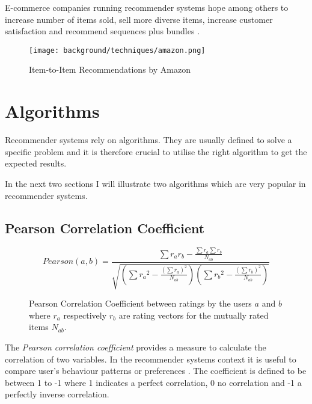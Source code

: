 E-commerce companies running recommender systems hope among others to increase number of items sold, sell more diverse items, increase customer satisfaction and recommend sequences plus bundles \cite{herlocker04}.

\begin{figure}[ht]
    \texttt{[image: background/techniques/amazon.png]}
    \caption{Item-to-Item Recommendations by Amazon}
    \label{fig:itembased-amazon}
\end{figure}



\section{Algorithms}

Recommender systems rely on algorithms. They are usually defined to solve a specific problem and it is therefore crucial to utilise the right algorithm to get the expected results.

In the next two sections I will illustrate two algorithms which are very popular in recommender systems.

\subsection{Pearson Correlation Coefficient}

\begin{figure}[ht]
    \[Pearson(a,b) = \frac{\sum r_ar_b - \frac{\sum r_a \sum r_b}{N_{ab}}}{\sqrt{(\sum {r_a}^{2} - \frac{(\sum r_a)^{2}}{N_{ab}})(\sum {r_b}^{2} - \frac{(\sum r_b)^{2}}{N_{ab}})}}\]
    \caption[Pearson Correlation Coefficient]{Pearson Correlation Coefficient between ratings by the users \(a\) and \(b\) where \(r_a\) respectively \(r_b\) are rating vectors for the mutually rated items \(N_{ab}\).}
    \label{fig:pearson}
\end{figure}

The \textit{Pearson correlation coefficient} provides a measure to calculate the correlation of two variables. In the recommender systems context it is useful to compare user's behaviour patterns or preferences \cite{segaran07}. The coefficient is defined to be between 1 to -1 where 1 indicates a perfect correlation, 0 no correlation and -1 a perfectly inverse correlation.


